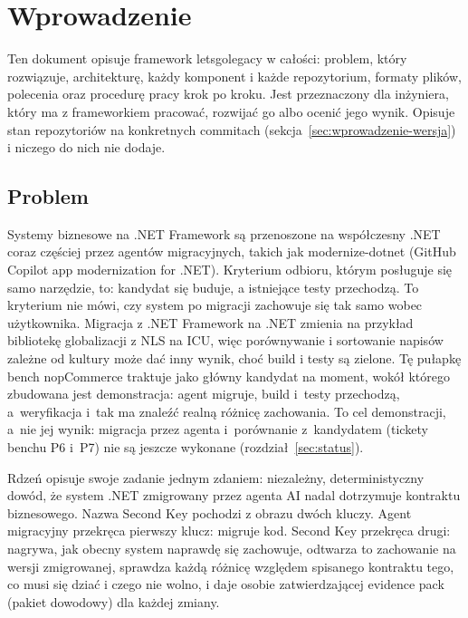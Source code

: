 \section{Wprowadzenie}\label{sec:wprowadzenie}

Ten dokument opisuje framework letsgolegacy w całości: problem, który rozwiązuje,
architekturę, każdy komponent i każde repozytorium, formaty plików, polecenia oraz
procedurę pracy krok po kroku. Jest przeznaczony dla inżyniera, który ma z frameworkiem
pracować, rozwijać go albo ocenić jego wynik. Opisuje stan repozytoriów na konkretnych
commitach (sekcja~\ref{sec:wprowadzenie-wersja}) i niczego do nich nie dodaje.

\subsection{Problem}\label{sec:wprowadzenie-problem}

Systemy biznesowe na .NET Framework są przenoszone na współczesny .NET coraz częściej
przez agentów migracyjnych, takich jak modernize-dotnet (GitHub Copilot app
modernization for .NET). Kryterium odbioru, którym posługuje się samo narzędzie, to:
kandydat się buduje, a istniejące testy przechodzą. To kryterium nie mówi, czy system po
migracji zachowuje się tak samo wobec użytkownika. Migracja z .NET Framework na .NET
zmienia na przykład bibliotekę globalizacji z NLS na ICU, więc porównywanie i sortowanie
napisów zależne od kultury może dać inny wynik, choć build i testy są zielone. Tę
pułapkę bench nopCommerce traktuje jako główny kandydat na moment, wokół którego zbudowana
jest demonstracja: agent migruje, build i~testy przechodzą, a~weryfikacja i~tak ma znaleźć
realną różnicę zachowania. To cel demonstracji, a~nie jej wynik: migracja przez agenta
i~porównanie z~kandydatem (tickety benchu P6 i~P7) nie są jeszcze wykonane
(rozdział~\ref{sec:status}).

Rdzeń opisuje swoje zadanie jednym zdaniem: niezależny, deterministyczny dowód, że system
.NET zmigrowany przez agenta AI nadal dotrzymuje kontraktu biznesowego. Nazwa Second Key
pochodzi z obrazu dwóch kluczy. Agent migracyjny przekręca pierwszy klucz: migruje kod.
Second Key przekręca drugi: nagrywa, jak obecny system naprawdę się zachowuje, odtwarza to
zachowanie na wersji zmigrowanej, sprawdza każdą różnicę względem spisanego kontraktu
tego, co musi się dziać i czego nie wolno, i daje osobie zatwierdzającej evidence pack
(pakiet dowodowy) dla każdej zmiany. 

